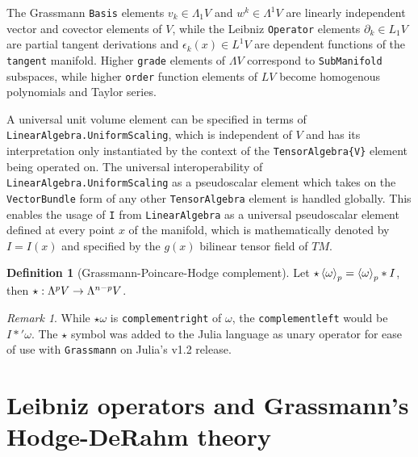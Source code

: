 \documentclass[]{article}
\theoremstyle{definition}
\newtheorem{definition}{Definition}
\theoremstyle{remark}
\newtheorem*{remark}{Remark}
\begin{document}
The Grassmann \verb`Basis` elements $v_k\in\Lambda_1V$ and $w^k\in\Lambda^1V$ are linearly independent vector and covector elements of $V$, while the Leibniz \verb`Operator` elements $\partial_k\in L_1V$ are partial tangent derivations and $\epsilon_k(x)\in L^1V$ are dependent functions of the \verb`tangent` manifold. 
Higher \verb`grade` elements of $\Lambda V$ correspond to \verb`SubManifold` subspaces, while higher \verb`order` function elements of $LV$ become homogenous polynomials and Taylor series.


A universal unit volume element can be specified in terms of \verb`LinearAlgebra.UniformScaling`, which is independent of $V$ and has its interpretation only instantiated by the context of the \verb`TensorAlgebra{V}` element being operated on.
The universal interoperability of \verb`LinearAlgebra.UniformScaling` as a pseudoscalar element which takes on the \verb`VectorBundle` form of any other \verb`TensorAlgebra` element is handled globally. 
This enables the usage of \verb`I` from \verb`LinearAlgebra` as a universal pseudoscalar element defined at every point $x$ of the manifold, which is mathematically denoted by $I=I(x)$ and specified by the $g(x)$ bilinear tensor field of $TM$.

\begin{definition}[Grassmann-Poincare-Hodge complement]
	Let $\star\left\langle \omega \right\rangle_p = \left\langle \omega \right\rangle_p\ast I$, %
	 then $\star : \Lambda^pV\rightarrow\Lambda^{n-p}V$.
\end{definition}
\begin{remark}
	While $\star\omega$ is \verb`complementright` of $\omega$, the \verb`complementleft` would be $I\ast'\omega$. The $\star$ symbol was added to the Julia language as unary operator for ease of use with \verb`Grassmann` on Julia's v1.2 release.
\end{remark}

\section{Leibniz operators and Grassmann's Hodge-DeRahm theory}
\end{document}
